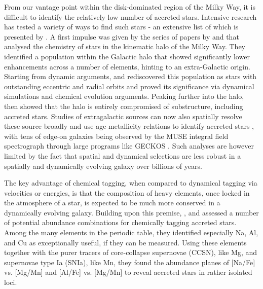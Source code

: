 \documentclass[fleqn,usenatbib]{mnras}
\begin{document}
From our vantage point within the disk-dominated region of the Milky Way, it is difficult to identify the relatively low number of accreted stars. Intensive research has tested a variety of ways to find such stars - an extensive list of which is presented by \citet{Buder2022}. A first impulse was given by the series of papers by \citet{Nissen2010, Nissen2011, Nissen2014} and \citet{Schuster2012} that analysed the chemistry of stars in the kinematic halo of the Milky Way. They identified a population within the Galactic halo that showed significantly lower enhancements across a number of elements, hinting to an extra-Galactic origin. Starting from dynamic arguments, \citet{Belokurov2018} and \citet{Helmi2018} rediscovered this population as stars with outstanding eccentric and radial orbits and proved its significance via dynamical simulations and chemical evolution arguments. Peaking further into the halo, \citet{Naidu2020} then showed that the halo is entirely compromised of substructure, including accreted stars. Studies of extragalactic sources can now also spatially resolve these source broadly and use age-metallicity relations to identify accreted stars \citep{Martig2021}, with tens of edge-on galaxies being observed by the MUSE integral field spectrograph through large programs like GECKOS \citep{GECKOS2023}. Such analyses are however limited by the fact that spatial and dynamical selections are less robust in a spatially and dynamically evolving galaxy over billions of years.

The key advantage of chemical tagging, when compared to dynamical tagging via velocities or energies, is that the composition of heavy elements, once locked in the atmosphere of a star, is expected to be much more conserved in a dynamically evolving galaxy. Building upon this premise, \citet{Hawkins2015}, \citet{Das2020} and \citet{Buder2022} assessed a number of potential abundance combinations for chemically tagging accreted stars. Among the many elements in the periodic table, they identified especially Na, Al, and Cu as exceptionally useful, if they can be measured. Using these elements together with the purer tracers of core-collapse supernovae (CCSN), like Mg, and supernovae type Ia (SNIa), like Mn, they found the abundance planes of [Na/Fe] vs. [Mg/Mn] and [Al/Fe] vs. [Mg/Mn] to reveal accreted stars in rather isolated loci.
\end{document}
